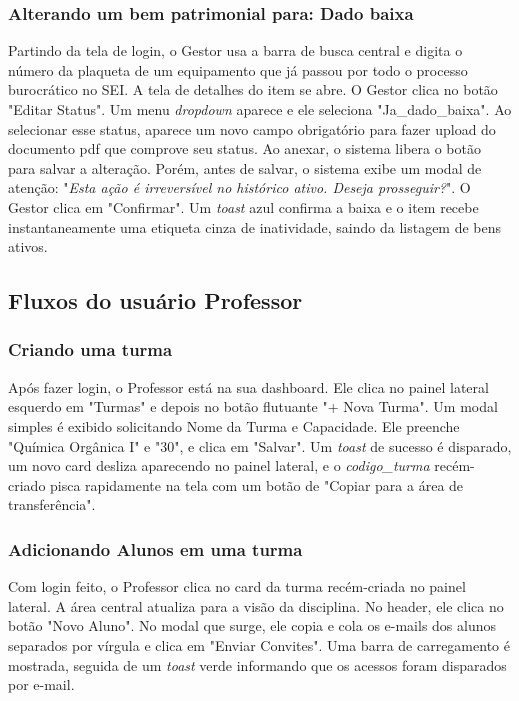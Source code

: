 \documentclass[12pt,a4paper]{article}
\begin{document}
\subsubsection{Alterando um bem patrimonial para: Dado baixa}
Partindo da tela de login, o Gestor usa a barra de busca central e digita o número da plaqueta de um equipamento que já passou por todo o processo burocrático no SEI. A tela de detalhes do item se abre. O Gestor clica no botão "Editar Status". Um menu \textit{dropdown} aparece e ele seleciona "Ja\_dado\_baixa". Ao selecionar esse status, aparece um novo campo obrigatório para fazer upload do documento pdf que comprove seu status. Ao anexar, o sistema libera o botão para salvar a alteração. Porém, antes de salvar, o sistema exibe um modal de atenção: "\textit{Esta ação é irreversível no histórico ativo. Deseja prosseguir?}". O Gestor clica em "Confirmar". Um \textit{toast} azul confirma a baixa e o item recebe instantaneamente uma etiqueta cinza de inatividade, saindo da listagem de bens ativos.

\subsection{Fluxos do usuário Professor}

\subsubsection{Criando uma turma}
Após fazer login, o Professor está na sua dashboard. Ele clica no painel lateral esquerdo em "Turmas" e depois no botão flutuante "+ Nova Turma". Um modal simples é exibido solicitando Nome da Turma e Capacidade. Ele preenche "Química Orgânica I" e "30", e clica em "Salvar". Um \textit{toast} de sucesso é disparado, um novo card desliza aparecendo no painel lateral, e o \textit{codigo\_turma} recém-criado pisca rapidamente na tela com um botão de "Copiar para a área de transferência".

\subsubsection{Adicionando Alunos em uma turma}
Com login feito, o Professor clica no card da turma recém-criada no painel lateral. A área central atualiza para a visão da disciplina. No header, ele clica no botão "Novo Aluno". No modal que surge, ele copia e cola os e-mails dos alunos separados por vírgula e clica em "Enviar Convites". Uma barra de carregamento é mostrada, seguida de um \textit{toast} verde informando que os acessos foram disparados por e-mail.
\end{document}
